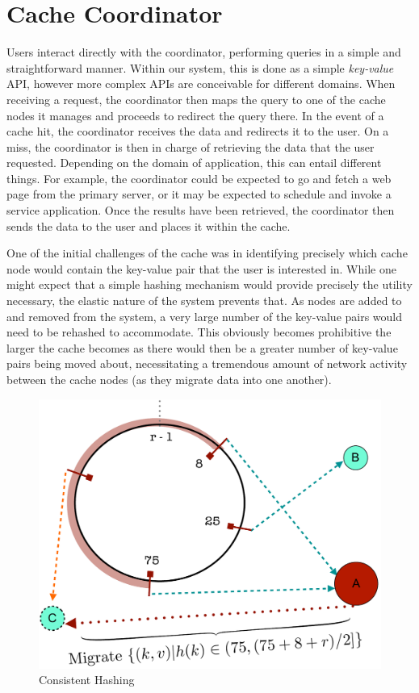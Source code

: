 \section{Cache Coordinator} %
\label{sec:Cache_Coordinator}
Users interact directly with the coordinator, performing queries in a simple
and straightforward manner. Within our system, this is done as a simple
\emph{key-value} API, however more complex APIs are conceivable for different
domains.  When receiving a request, the coordinator then maps the query to one
of the cache nodes it manages and proceeds to redirect the query there. In the
event of a cache hit, the coordinator receives the data and redirects it to the
user.  On a miss, the coordinator is then in charge of retrieving the data that
the user requested. Depending on the domain of application, this can entail
different things. For example, the coordinator could be expected to go and
fetch a web page from the primary server, or it may be expected to schedule and
invoke a service application. Once the results have been retrieved, the
coordinator then sends the data to the user and places it within the cache.

One of the initial challenges of the cache was in identifying precisely which
cache node would contain the key-value pair that the user is interested in.
While one might expect that a simple hashing mechanism would provide precisely
the utility necessary, the elastic nature of the system prevents that. As nodes
are added to and removed from the system, a very large number of the key-value
pairs would need to be rehashed to accommodate. This obviously becomes
prohibitive the larger the cache becomes as there would then be a greater
number of key-value pairs being moved about, necessitating a tremendous amount
of network activity between the cache nodes (as they migrate data into one
another).

\begin{figure}
\begin{center}
\includegraphics[scale=0.5]{figures/hashing.pdf}
\end{center}
\caption{Consistent Hashing}
\label{fig:hashing}
\end{figure}

